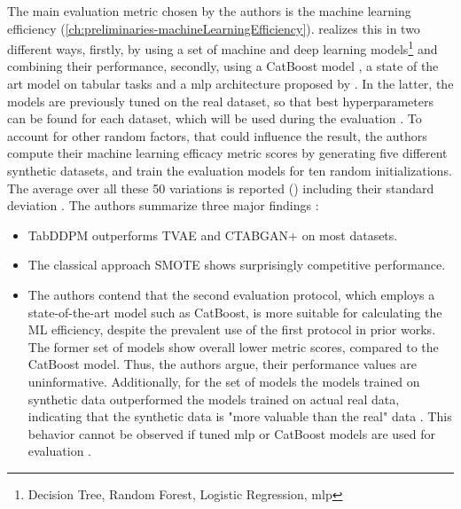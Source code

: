 The main evaluation metric chosen by the authors is the machine learning efficiency (\autoref{ch:preliminaries-machineLearningEfficiency}).
\cite{kotelnikov2022TabDDPMModellingTabular} realizes this in two different ways, firstly, by using a set of machine and deep learning models\footnote[]{Decision Tree, Random Forest, Logistic Regression, \gls{mlp}} and combining their performance,
secondly, using a CatBoost model \cite{prokhorenkova2018CatBoostUnbiasedBoosting}, a state of the art model on tabular tasks \cite{kotelnikov2022TabDDPMModellingTabular} and a \gls{mlp} architecture proposed by \cite{gorishniy2021RevisitingDeepLearning}.
In the latter, the models are previously tuned on the real dataset, so that best hyperparameters can be found for each dataset, which will be used during the evaluation \cite{kotelnikov2022TabDDPMModellingTabular}.
To account for other random factors, that could influence the result, the authors compute their machine learning efficacy metric scores by generating five different synthetic datasets, and train the evaluation models for ten random initializations.
The average over all these 50 variations is reported (\cite[Table 3, 4, p. 8]{kotelnikov2022TabDDPMModellingTabular}) including their standard deviation \cite{kotelnikov2022TabDDPMModellingTabular}.
The authors summarize three major findings \cite{kotelnikov2022TabDDPMModellingTabular}:
\begin{itemize}
    \item TabDDPM outperforms TVAE and CTABGAN+ on most datasets.
    \item The classical approach SMOTE shows surprisingly competitive performance.
    \item The authors contend that the second evaluation protocol, which employs a state-of-the-art model such as CatBoost, is more suitable for calculating the ML efficiency, 
    despite the prevalent use of the first protocol in prior works. 
    The former set of models show overall lower metric scores, compared to the CatBoost model.
    Thus, the authors argue, their performance values are uninformative.
    Additionally, for the set of models the models trained on synthetic data outperformed the models trained on actual real data, indicating that the 
    synthetic data is "more valuable than the real" data \cite[p. 8]{kotelnikov2022TabDDPMModellingTabular}.
    This behavior cannot be observed if tuned \gls{mlp} or CatBoost models are used for evaluation \cite{kotelnikov2022TabDDPMModellingTabular}.
\end{itemize}

